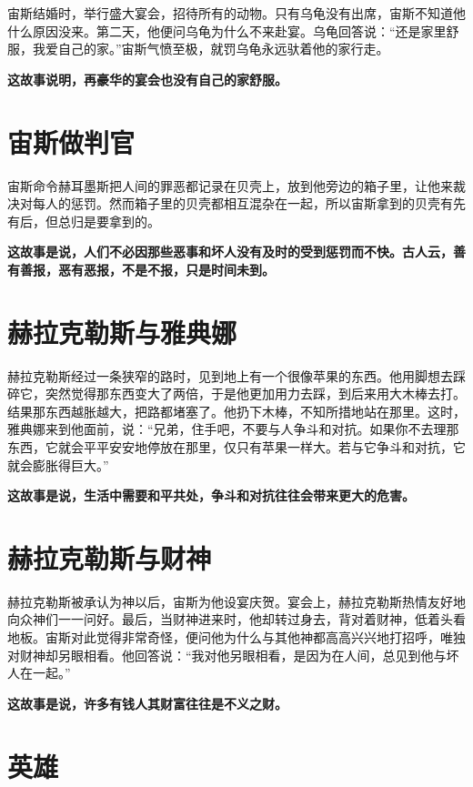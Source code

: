 宙斯结婚时，举行盛大宴会，招待所有的动物。只有乌龟没有出席，宙斯不知道他什么原因没来。第二天，他便问乌龟为什么不来赴宴。乌龟回答说：“还是家里舒服，我爱自己的家。”宙斯气愤至极，就罚乌龟永远驮着他的家行走。

{\bfseries \color{red}这故事说明，再豪华的宴会也没有自己的家舒服。}

\section{宙斯做判官}

宙斯命令赫耳墨斯把人间的罪恶都记录在贝壳上，放到他旁边的箱子里，让他来裁决对每人的惩罚。然而箱子里的贝壳都相互混杂在一起，所以宙斯拿到的贝壳有先有后，但总归是要拿到的。

{\bfseries \color{red}这故事是说，人们不必因那些恶事和坏人没有及时的受到惩罚而不快。古人云，善有善报，恶有恶报，不是不报，只是时间未到。}

\section{赫拉克勒斯与雅典娜}

赫拉克勒斯经过一条狭窄的路时，见到地上有一个很像苹果的东西。他用脚想去踩碎它，突然觉得那东西变大了两倍，于是他更加用力去踩，到后来用大木棒去打。结果那东西越胀越大，把路都堵塞了。他扔下木棒，不知所措地站在那里。这时，雅典娜来到他面前，说：“兄弟，住手吧，不要与人争斗和对抗。如果你不去理那东西，它就会平平安安地停放在那里，仅只有苹果一样大。若与它争斗和对抗，它就会膨胀得巨大。”

{\bfseries \color{red}这故事是说，生活中需要和平共处，争斗和对抗往往会带来更大的危害。}

\section{赫拉克勒斯与财神}

赫拉克勒斯被承认为神以后，宙斯为他设宴庆贺。宴会上，赫拉克勒斯热情友好地向众神们一一问好。最后，当财神进来时，他却转过身去，背对着财神，低着头看地板。宙斯对此觉得非常奇怪，便问他为什么与其他神都高高兴兴地打招呼，唯独对财神却另眼相看。他回答说：“我对他另眼相看，是因为在人间，总见到他与坏人在一起。”

{\bfseries \color{red}这故事是说，许多有钱人其财富往往是不义之财。}

\section{英雄}


